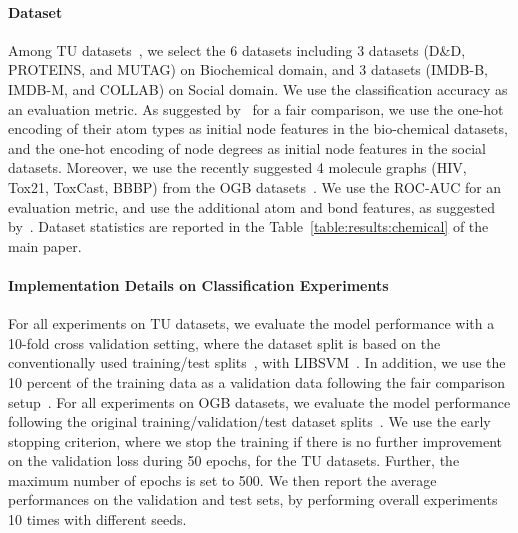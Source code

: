 \documentclass{article} \usepackage{iclr2021_conference,times}
\begin{document}
\paragraph{Dataset \label{appendix/classification/data}}
Among TU datasets~\citep{classification/datasets}, we select the 6 datasets including 3 datasets (D\&D, PROTEINS, and MUTAG) on Biochemical domain, and 3 datasets (IMDB-B, IMDB-M, and COLLAB) on Social domain. We use the classification accuracy as an evaluation metric. As suggested by~\cite{fair/GNN} for a fair comparison, we use the one-hot encoding of their atom types as initial node features in the bio-chemical datasets, and the one-hot encoding of node degrees as initial node features in the social datasets. Moreover, we use the recently suggested 4 molecule graphs (HIV, Tox21, ToxCast, BBBP) from the OGB datasets~\citep{OGB}. We use the ROC-AUC for an evaluation metric, and use the additional atom and bond features, as suggested by~\citet{OGB}. Dataset statistics are reported in the Table~\ref{table:results:chemical} of the main paper.

\paragraph{Implementation Details on Classification Experiments \label{appendix/classification/implementation}}
For all experiments on TU datasets, we evaluate the model performance with a 10-fold cross validation setting, where the dataset split is based on the conventionally used training/test splits~\citep{TUdataset/split, SortPool, GIN}, with LIBSVM~\citep{LIBSVM}. In addition, we use the 10 percent of the training data as a validation data following the fair comparison setup~\citep{fair/GNN}. For all experiments on OGB datasets, we evaluate the model performance following the original training/validation/test dataset splits~\citep{OGB}. We use the early stopping criterion, where we stop the training if there is no further improvement on the validation loss during 50 epochs, for the TU datasets. Further, the maximum number of epochs is set to 500. We then report the average performances on the validation and test sets, by performing overall experiments 10 times with different seeds.
\end{document}
